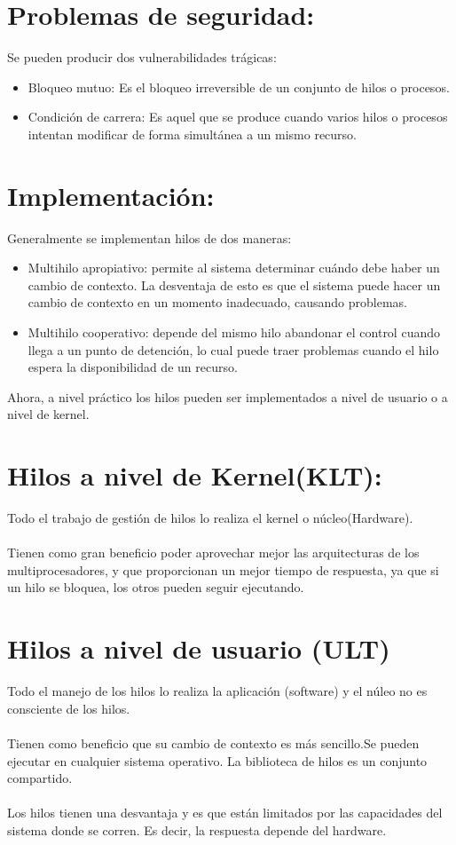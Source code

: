 \documentclass{report}   %
\begin{document}
\section*{Problemas de seguridad:}
Se pueden producir dos vulnerabilidades trágicas:
\begin{itemize}
    \item  Bloqueo mutuo: Es el bloqueo irreversible de un conjunto de hilos o procesos.
 \item 
  Condición de carrera: Es aquel que se produce cuando varios hilos o procesos intentan modificar de forma simultánea a un mismo recurso.\\
\end{itemize}

 
  
  \section*{Implementación:}
 Generalmente se implementan hilos de dos maneras:
\begin{itemize}
    \item Multihilo apropiativo: permite al sistema determinar cuándo debe haber un cambio de contexto. La desventaja de esto es que el sistema puede hacer un cambio de contexto en un momento inadecuado, causando problemas.
    \item Multihilo cooperativo: depende del mismo hilo abandonar el control cuando llega a un punto de detención, lo cual puede traer problemas cuando el hilo espera la disponibilidad de un recurso.
\end{itemize}

Ahora, a nivel práctico los hilos pueden ser implementados a nivel de usuario o a nivel de kernel. 

\section*{Hilos a nivel de Kernel(KLT):}
Todo el trabajo de gestión de hilos lo realiza el kernel o núcleo(Hardware).\\\\
Tienen como gran beneficio poder aprovechar mejor las arquitecturas de los
multiprocesadores, y que proporcionan un mejor tiempo de respuesta, ya que si un hilo se bloquea, los otros pueden seguir ejecutando.
\section*{Hilos a nivel de usuario (ULT)}
 Todo el manejo de los hilos lo realiza la aplicación (software) y el núleo no es consciente de los hilos.\\\\
Tienen como beneficio que su cambio de contexto es más sencillo.Se pueden ejecutar en cualquier sistema operativo. La biblioteca de hilos es un conjunto compartido.\\\\
Los hilos tienen  una desvantaja y es que están limitados por las capacidades del sistema donde se corren. Es decir, la respuesta depende del hardware.
\end{document}
